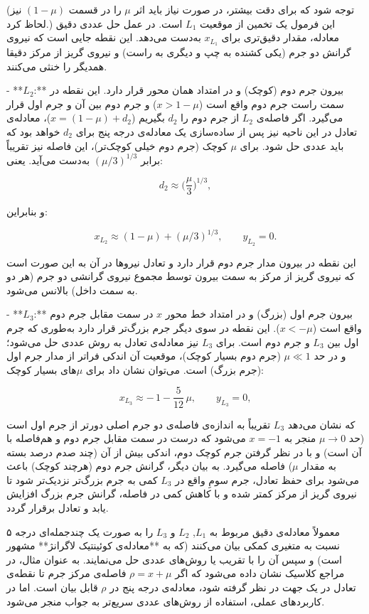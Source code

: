 (توجه شود که برای دقت بیشتر، در صورت نیاز باید اثر $\mu$ را در قسمت $(1-\mu)$ نیز لحاظ کرد.) این فرمول یک تخمین از موقعیت $L_1$ است. در عمل حل عددی دقیق معادله، مقدار دقیق‌تری برای $x_{L_1}$ به‌دست می‌دهد. این نقطه جایی است که نیروی گرانش دو جرم (یکی کشنده به چپ و دیگری به راست) و نیروی گریز از مرکز دقیقا همدیگر را خنثی می‌کنند. 

- **$L_2$:** بیرون جرم دوم (کوچک) و در امتداد همان محور قرار دارد. این نقطه در سمت راست جرم دوم واقع است ($x > 1-\mu$) و جرم دوم بین آن و جرم اول قرار می‌گیرد. اگر فاصله‌ی $L_2$ از جرم دوم را $d_2$ بگیریم ($x = (1-\mu) + d_2$)، معادله‌ی تعادل در این ناحیه نیز پس از ساده‌سازی یک معادله‌ی درجه پنج برای $d_2$ خواهد بود که باید عددی حل شود. برای $\mu$ کوچک (جرم دوم خیلی کوچک‌تر)، این فاصله نیز تقریباً برابر $(\mu/3)^{1/3}$ به‌دست می‌آید. یعنی: 

$$d_2 \approx \Big(\dfrac{\mu}{3}\Big)^{1/3},$$ 

و بنابراین: 

$$x_{L_2} \approx (1-\mu) + (\mu/3)^{1/3}, \qquad y_{L_2}=0.$$ 

این نقطه در بیرون مدار جرم دوم قرار دارد و تعادل نیروها در آن به این صورت است که نیروی گریز از مرکز به سمت بیرون توسط مجموع نیروی گرانشی دو جرم (هر دو به سمت داخل) بالانس می‌شود. 

- **$L_3$:** بیرون جرم اول (بزرگ) و در امتداد خط محور $x$ در سمت مقابل جرم دوم واقع است ($x < -\mu$). این نقطه در سوی دیگر جرم بزرگ‌تر قرار دارد به‌طوری که جرم اول بین $L_3$ و جرم دوم است. برای $L_3$ نیز معادله‌ی تعادل به روش عددی حل می‌شود؛ و در حد $\mu \ll 1$ (جرم دوم بسیار کوچک)، موقعیت آن اندکی فراتر از مدار جرم اول (جرم بزرگ) است. می‌توان نشان داد برای $\mu$های بسیار کوچک: 

$$x_{L_3} \approx -\,1 - \dfrac{5}{12}\,\mu, \qquad y_{L_3}=0,$$ 

که نشان می‌دهد $L_3$ تقریباً به اندازه‌ی فاصله‌ی دو جرم اصلی دورتر از جرم اول است (حد $\mu \to 0$ منجر به $x=-1$ می‌شود که درست در سمت مقابل جرم دوم و هم‌فاصله با آن است) و با در نظر گرفتن جرم کوچک دوم، اندکی بیش از آن (چند صدم درصد بسته به مقدار $\mu$) فاصله می‌گیرد. به بیان دیگر، گرانش جرم دوم (هرچند کوچک) باعث می‌شود برای حفظ تعادل، جرم سومِ واقع در $L_3$ کمی به جرم بزرگ‌تر نزدیک‌تر شود تا نیروی گریز از مرکز کمتر شده و با کاهش کمی در فاصله، گرانش جرم بزرگ افزایش یابد و تعادل برقرار گردد.  

معمولاً معادله‌ی دقیق مربوط به $L_1$, $L_2$ و $L_3$ را به صورت یک چندجمله‌ای درجه ۵ نسبت به متغیری کمکی بیان می‌کنند (که به **معادله‌ی کوئینتیک لاگرانژ** مشهور است) و سپس آن را با تقریب یا روش‌های عددی حل می‌نمایند. به عنوان مثال، در مراجع کلاسیک نشان داده می‌شود که اگر $\rho = x + \mu$ فاصله‌ی مرکز جرم تا نقطه‌ی تعادل در یک جهت در نظر گرفته شود، معادله‌ی درجه پنج در $\rho$ قابل بیان است. اما در کاربردهای عملی، استفاده از روش‌های عددی سریع‌تر به جواب منجر می‌شود. 


